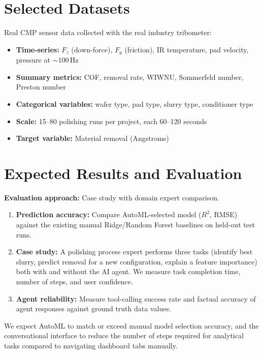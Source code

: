 \documentclass[11pt]{article}
\begin{document}
\section{Selected Datasets}

Real CMP sensor data collected with the real industry tribometer:
\begin{itemize}[noitemsep]
  \item \textbf{Time-series:} $F_z$ (down-force), $F_y$ (friction), IR temperature, pad velocity, pressure at $\sim$100\,Hz
  \item \textbf{Summary metrics:} COF, removal rate, WIWNU, Sommerfeld number, Preston number
  \item \textbf{Categorical variables:} wafer type, pad type, slurry type, conditioner type
  \item \textbf{Scale:} 15--80 polishing runs per project, each 60--120 seconds
  \item \textbf{Target variable:} Material removal (Angstroms)
\end{itemize}

\section{Expected Results and Evaluation}

\textbf{Evaluation approach:} Case study with domain expert comparison.

\begin{enumerate}[noitemsep]
  \item \textbf{Prediction accuracy:} Compare AutoML-selected model ($R^2$, RMSE) against the existing manual Ridge/Random Forest baselines on held-out test runs.

  \item \textbf{Case study:} A polishing process expert performs three tasks (identify best slurry, predict removal for a new configuration, explain a feature importance) both with and without the AI agent. We measure task completion time, number of steps, and user confidence.

  \item \textbf{Agent reliability:} Measure tool-calling success rate and factual accuracy of agent responses against ground truth data values.
\end{enumerate}

We expect AutoML to match or exceed manual model selection accuracy, and the conversational interface to reduce the number of steps required for analytical tasks compared to navigating dashboard tabs manually.
\end{document}
